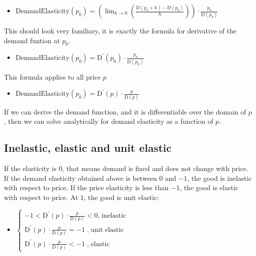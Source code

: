 \documentclass[
]{book}
\providecommand{\tightlist}{%
  \setlength{\itemsep}{0pt}\setlength{\parskip}{0pt}}
\begin{document}
\begin{itemize}
\tightlist
\item
  \(\displaystyle \textrm{DemandElasticity}(p_0 )=\left(\lim_{h\to 0} \left(\frac{\textrm{D}(p_0 +h)-\textrm{D}(p_0 )}{h}\right)\right)\cdot \frac{p_0 }{\textrm{D}(p_0 )}\)
\end{itemize}

This should look very familiary, it is exactly the formula for
derivative of the demand funtion at \(p_0\).

\begin{itemize}
\tightlist
\item
  \(\displaystyle \textrm{DemandElasticity}(p_0 )={\textrm{D}}^{\prime } (p_0 )\cdot \frac{p_0 }{\textrm{D}(p_0 )}\)
\end{itemize}

This formula applies to all price \(p\)

\begin{itemize}
\tightlist
\item
  \(\displaystyle \textrm{DemandElasticity}(p_0 )={\textrm{D}}^{\prime } (p)\cdot \frac{p}{\textrm{D}(p)}\)
\end{itemize}

If we can derive the demand function, and it is differentiable over the
domain of \(p\), then we can solve analytically for demand elasticity as a
function of \(p\).

\hypertarget{inelastic-elastic-and-unit-elastic}{%
\subsection{\texorpdfstring{\textbf{Inelastic, elastic and unit elastic}}{Inelastic, elastic and unit elastic}}\label{inelastic-elastic-and-unit-elastic}}

If the elasticity is \(0\), that means demand is fixed and does not change
with price. If the demand elasticity obtained above is between \(0\) and
\(-1\), the good is inelastic with respect to price. If the price
elasticity is less than \(-1\), the good is elastic with respect to price.
At \(1\), the good is unit elastic:

\begin{itemize}
\tightlist
\item
  \(\displaystyle \left\lbrace \begin{array}{c} -1<{\textrm{D}}^{\prime } (p)\cdot \frac{p}{\textrm{D}(p)}<0\textrm{,}\;\textrm{inelastic}\\ {\textrm{D}}^{\prime } (p)\cdot \frac{p}{\textrm{D}(p)}=-1\;\textrm{,}\;\textrm{unit}\;\textrm{elastic}\\ {\textrm{D}}^{\prime } (p)\cdot \frac{p}{\textrm{D}(p)}<-1\;\textrm{,}\;\textrm{elastic} \end{array}\right.\)
\end{itemize}
\end{document}
